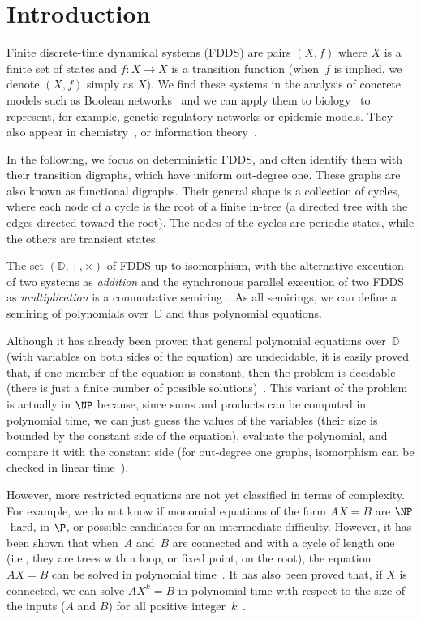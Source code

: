 \section{Introduction}
\label{sec:introduction}

Finite discrete-time dynamical systems (FDDS) are pairs $(X,f)$ where $X$ is a finite set of states and $f: X \to X$ is a transition function (when~$f$ is implied, we denote $(X,f)$ simply as $X$).
We find these systems in the analysis of concrete models such as Boolean networks~\cite{gershenson2004random_bn,automata_book}
and we can apply them to biology~\cite{thomas1990biological_feedback,thomas1973genetic_control_circuits,bernot2013computational_biology} to represent, for example, genetic regulatory networks or epidemic models. 
They also appear in chemistry~\cite{reaction_systems}, or information theory~\cite{gadouleau2011graph_entropy}.

In the following, we focus on deterministic FDDS, and often identify them with their transition digraphs, which have uniform out-degree one.
These graphs are also known as functional digraphs. 
Their general shape is a collection of cycles, where each node of a cycle is the root of a finite in-tree (a directed tree with the edges directed toward the root).
The nodes of the cycles are periodic states, while the others are transient states.

The set $(\mathbb{D}, +, \times)$ of FDDS up to isomorphism, with the alternative execution of two systems as \emph{addition} and the synchronous parallel 
execution of two FDDS as \emph{multiplication} is a commutative semiring~\cite{article_fondateur}. 
As all semirings, we can define a semiring of polynomials over~$\mathbb{D}$ and thus polynomial equations.

Although it has already been proven that general polynomial equations over~$\mathbb{D}$ (with variables on both sides of the equation) are undecidable, it is easily proved that, if one member of the equation is constant, then the problem is decidable (there is just a finite number of possible solutions)~\cite{article_fondateur}.
This variant of the problem is actually in $\NP$ because, since sums and products can be computed in polynomial time, we can just guess the values of the variables (their size is bounded by the constant side of the equation), evaluate the polynomial, and compare it with the constant side (for out-degree one graphs, isomorphism can be checked in linear time~\cite{testIsoLinear}).

However, more restricted equations are not yet classified in terms of complexity.
For example, we do not know if monomial equations of the form $AX = B$ are $\NP$-hard, in $\P$, or possible candidates for an intermediate difficulty. 
However, it has been shown that when~$A$ and~$B$ are connected and with a cycle of length one (i.e., they are trees with a loop, or fixed point, on the root), the equation $AX = B$ can be solved in polynomial time~\cite{article_arbre}.
It has also been proved that, if $X$ is connected, we can solve $AX^k = B$ in polynomial time with respect to the size of the inputs ($A$ and $B$) for all positive integer~$k$~\cite{kroot}.

